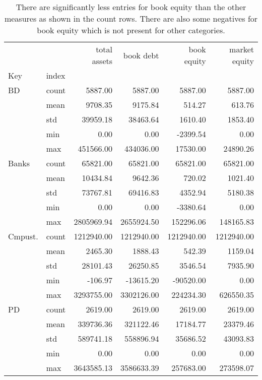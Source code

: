 \begin{table}
\caption{There are significantly less entries for book equity than the other measures as shown in the count rows. There are also some negatives for book equity which is not present for other categories. }
\label{tab:Table 2.1}
\begin{tabular}{llrrrr}
\toprule
 &  & total assets & book debt & book equity & market equity \\
Key & index &  &  &  &  \\
\midrule
{BD} & count & 5887.00 & 5887.00 & 5887.00 & 5887.00 \\
 & mean & 9708.35 & 9175.84 & 514.27 & 613.76 \\
 & std & 39959.18 & 38463.64 & 1610.40 & 1853.40 \\
 & min & 0.00 & 0.00 & -2399.54 & 0.00 \\
 & max & 451566.00 & 434036.00 & 17530.00 & 24890.26 \\
\cline{1-6}
{Banks} & count & 65821.00 & 65821.00 & 65821.00 & 65821.00 \\
 & mean & 10434.84 & 9642.36 & 720.02 & 1021.40 \\
 & std & 73767.81 & 69416.83 & 4352.94 & 5180.38 \\
 & min & 0.00 & 0.00 & -3380.64 & 0.00 \\
 & max & 2805969.94 & 2655924.50 & 152296.06 & 148165.83 \\
\cline{1-6}
{Cmpust.} & count & 1212940.00 & 1212940.00 & 1212940.00 & 1212940.00 \\
 & mean & 2465.30 & 1888.43 & 542.39 & 1159.04 \\
 & std & 28101.43 & 26250.85 & 3546.54 & 7935.90 \\
 & min & -106.97 & -13615.20 & -90520.00 & 0.00 \\
 & max & 3293755.00 & 3302126.00 & 224234.30 & 626550.35 \\
\cline{1-6}
{PD} & count & 2619.00 & 2619.00 & 2619.00 & 2619.00 \\
 & mean & 339736.36 & 321122.46 & 17184.77 & 23379.46 \\
 & std & 589741.18 & 558896.94 & 35686.52 & 43093.83 \\
 & min & 0.00 & 0.00 & 0.00 & 0.00 \\
 & max & 3643585.13 & 3586633.39 & 257683.00 & 273598.07 \\
\cline{1-6}
\bottomrule
\end{tabular}
\end{table}
